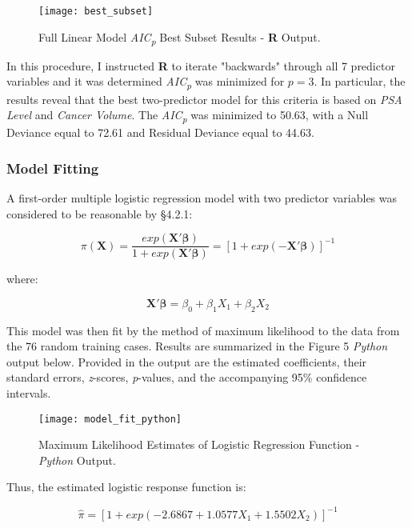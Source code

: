 \begin{figure}[H]
	\centering
	\texttt{[image: best\_subset]}
	\caption{Full Linear Model  \textit{AIC\textsubscript{p}} Best Subset Results - \textbf{R} Output.}
\end{figure}

In this procedure, I instructed \textbf{R} to iterate "backwards" through all 7 predictor variables and it was determined \textit{AIC\textsubscript{p}} was minimized for \(p=3\). In particular, the results reveal that the best two-predictor model for this criteria is based on \textit{PSA Level} and \textit{Cancer Volume}. The \textit{AIC\textsubscript{p}} was minimized to 50.63, with a Null Deviance equal to 72.61 and Residual Deviance equal to 44.63. 

\subsubsection{Model Fitting}
A first-order multiple logistic regression model with two predictor variables was considered to be reasonable by \S4.2.1: 

\begin{equation}
\pi(\textbf{X}) = \frac{exp(\textbf{X}'\boldsymbol{\beta})}{1+exp(\textbf{X}'\boldsymbol{\beta})} = [1+exp(-\textbf{X}'\boldsymbol{\beta})]^{-1}
\end{equation}

where:

\begin{equation}
\textbf{X}'\boldsymbol{\beta} = \beta_0+\beta_1X_1+\beta_2X_2
\end{equation}

This model was then fit by the method of maximum likelihood to the data from the 76 random training cases. Results are summarized in the Figure 5 \textit{Python} output below. Provided in the output are the estimated coefficients, their standard errors, \textit{z}-scores, \textit{p}-values, and the accompanying 95\% confidence intervals. \par

\begin{figure}[H]
	\centering
	\texttt{[image: model\_fit\_python]}
	\caption{Maximum Likelihood Estimates of Logistic Regression Function - \textit{Python} Output.}
\end{figure}

Thus, the estimated logistic response function is:

\begin{equation}
\hat{\pi}=[ 1+ exp(-2.6867 + 1.0577X_1 + 1.5502X_2)]^{-1}
\end{equation}

